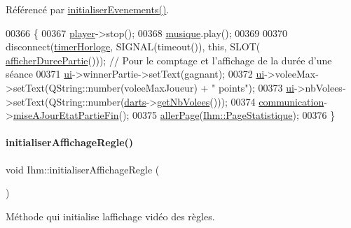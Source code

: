 Référencé par \hyperlink{ihm_8cpp_source_l00075}{initialiser\+Evenements()}.


\begin{DoxyCode}
00366 \{
00367     \hyperlink{class_ihm_a633230fb15d587e647ad9d2d6142ebc3}{player}->stop();
00368     \hyperlink{class_ihm_a6e2a173ec36ee846d6210117b4b85fa8}{musique}.play();
00369 
00370     disconnect(\hyperlink{class_ihm_a21ea35b212966fa2805241ea6237d351}{timerHorloge}, SIGNAL(timeout()), \textcolor{keyword}{this}, SLOT(
      \hyperlink{class_ihm_a808bd550b877499a38419a492595822e}{afficherDureePartie}())); \textcolor{comment}{// Pour le comptage et l'affichage de la durée d'une séance}
00371     \hyperlink{class_ihm_a0ac5f47856566ceeeca1720109bf70ea}{ui}->winnerPartie->setText(gagnant);
00372     \hyperlink{class_ihm_a0ac5f47856566ceeeca1720109bf70ea}{ui}->voleeMax->setText(QString::number(voleeMaxJoueur) + \textcolor{stringliteral}{" points"});
00373     \hyperlink{class_ihm_a0ac5f47856566ceeeca1720109bf70ea}{ui}->nbVolees->setText(QString::number(\hyperlink{class_ihm_a2a0f54d33f4d6b2531ec2190c4a2356e}{darts}->\hyperlink{class_darts_a4b93d786fbd25b9512ad08b67bca0a69}{getNbVolees}()));
00374     \hyperlink{class_ihm_a2f3d4781795781a840786cd8c2233899}{communication}->\hyperlink{class_communication_af6b9f4bf3b1df197ce20dccd9b78663f}{miseAJourEtatPartieFin}();
00375     \hyperlink{class_ihm_a52bf0bd258d00a16d3e1037a9288948b}{allerPage}(\hyperlink{class_ihm_a472c7a7bec7e6e0230842f78ace4833eaacc428ff827bccfb5e8bdb4634457f10}{Ihm::PageStatistique});
00376 \}
\end{DoxyCode}
\mbox{\label{class_ihm_a97b1938c38eef2427b5cf2326feeef3d}} 
\paragraph{\texorpdfstring{initialiser\+Affichage\+Regle()}{initialiserAffichageRegle()}}
{\footnotesize\ttfamily void Ihm\+::initialiser\+Affichage\+Regle (\begin{DoxyParamCaption}{ }\end{DoxyParamCaption})\hspace{0.3cm}{\ttfamily [private]}}



Méthode qui initialise l\textquotesingle{}affichage vidéo des règles. 



